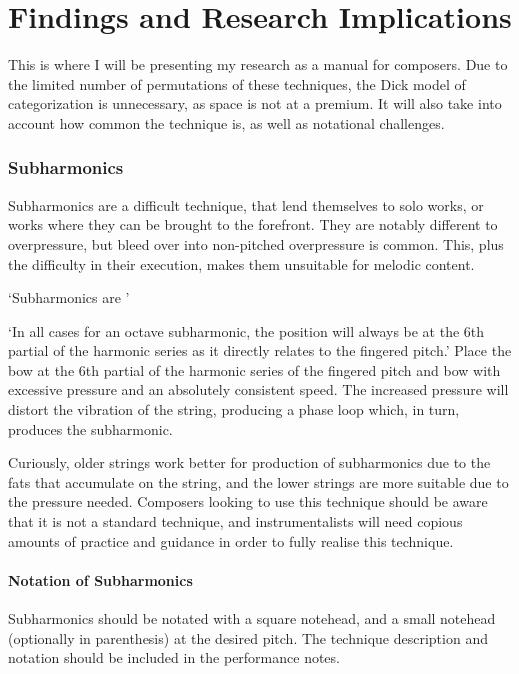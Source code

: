 
\chapter{Findings and Research Implications}
This is where I will be presenting my research as a manual for composers. 
Due to the limited number of permutations of these techniques, the Dick model of categorization is unnecessary, as space is not at a premium.\autocite{dickOtherFlute1989} 
It will also take into account how common the technique is, as well as notational challenges.

\subsection{Subharmonics} \label{sec:subharmonics}
Subharmonics are a difficult technique, that lend themselves to solo works, or works where they can be brought to the forefront.
They are notably different to overpressure, but bleed over into non-pitched overpressure is common.
This, plus the difficulty in their execution, makes them unsuitable for melodic content.

`Subharmonics are '

`In all cases for an octave subharmonic, the position will always be at the 6th partial of the harmonic series as it directly relates to the fingered pitch.'\autocite[]{longModernDoubleBass}
Place the bow at the 6th partial of the harmonic series of the fingered pitch and bow with excessive pressure and an absolutely consistent speed. 
The increased pressure will distort the vibration of the string, producing a phase loop which, in turn, produces the subharmonic.

Curiously, older strings work better for production of subharmonics due to the fats that accumulate on the string, and the lower strings are more suitable due to the pressure needed.\autocite{kimuraHowProduceSubharmonics1999}
Composers looking to use this technique should be aware that it is not a standard technique, and instrumentalists will need copious amounts of practice and guidance in order to fully realise this technique.

\subsubsection{Notation of Subharmonics} \label{sec:notation-subharmonics}
Subharmonics should be notated with a square notehead, and a small notehead (optionally in parenthesis) at the desired pitch.
The technique description and notation should be included in the performance notes.

